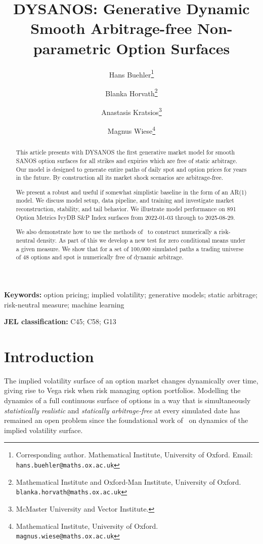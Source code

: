 \documentclass[11pt,a4paper]{article}
\title{DYSANOS: Generative Dynamic Smooth Arbitrage-free Non-parametric
Option Surfaces}
\author{%
  Hans Buehler\thanks{%
    Corresponding author. Mathematical Institute,
    University of Oxford. Email: \texttt{hans.buehler@maths.ox.ac.uk}}
  \and
  Blanka Horvath\thanks{%
    Mathematical Institute and Oxford-Man Institute,
    University of Oxford. \texttt{blanka.horvath@maths.ox.ac.uk}}
  \and
  Anastasis Kratsios\thanks{%
    McMaster University and Vector Institute.}
    \and
  Magnus Wiese\thanks{%
    Mathematical Institute,
    University of Oxford. \texttt{magnus.wiese@maths.ox.ac.uk}}
}
\date{}
\begin{document}
\maketitle


\begin{abstract}
This article presents with DYSANOS the first generative market model
for smooth SANOS option surfaces for all strikes and expiries which are
free of static arbitrage.
Our model is designed to generate entire paths of daily spot and option prices for years
in the future. By construction all its market shock scenarios are arbitrage-free.

We present a robust and useful if somewhat simplistic baseline in the form of an AR(1) model.
We discuss model setup, data pipeline, and training and investigate market
reconstruction, stability, and tail behavior. We illustrate model performance
on 891 Option Metrics IvyDB S\&P Index surfaces from 2022-01-03 through to
2025-08-29.

We also demonstrate how to use the methods of~\citet{removedrift} to construct
numerically a risk-neutral density. As part of this we develop a new test for zero conditional means under a given measure.
We show that for a set of 100,000 simulated paths
a trading universe of 48 options and spot is numerically free of dynamic arbitrage.
\end{abstract}

\noindent\textbf{Keywords:} option pricing; implied volatility; generative
models; static arbitrage; risk-neutral measure; machine learning

\medskip
\noindent\textbf{JEL classification:} C45; C58; G13

\bigskip


\section{Introduction}
\label{sec:intro}

The implied volatility surface of an option market changes dynamically over time, giving rise to
Vega risk when risk managing option portfolios.
Modelling the dynamics of a full continuous surface of options
in a way that is simultaneously \emph{statistically realistic} and \emph{statically
arbitrage-free} at every simulated date has remained an open problem since the
foundational work of~\citet{ContVol} on dynamics of the implied volatility surface.
\end{document}
